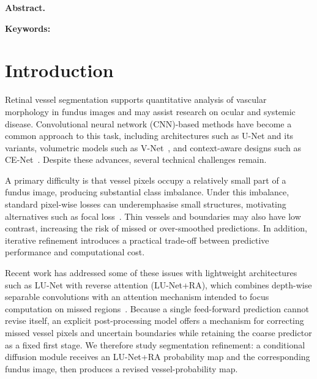 \documentclass[jimaging,article,submit,pdftex,moreauthors]
  {Definitions/mdpi}
\newif\ifmdpiclass\mdpiclasstrue
\newif\ifmdpiclass\mdpiclassfalse
\providecommand{\linelabel}[1]{}
\newcommand{\seclabel}[1]{\linelabel{rev:sec:#1}}
\begin{document}
\ifmdpiclass
\else
\begin{center}
  {\LARGE\bfseries \papertitle\par}
  \vspace{0.8em}
  {\large \paperauthor\par}
  \vspace{0.6em}
  {\small \paperaddress\par}
  \vspace{0.3em}
  {\small \papercorres\par}
\end{center}
\vspace{0.8em}
\noindent\textbf{Abstract.} \paperabstract\par
\vspace{0.5em}
\noindent\textbf{Keywords:} \paperkeywords\par
\vspace{1em}
\fi



\section{Introduction}
\label{sec:introduction}
\seclabel{introduction}

Retinal vessel segmentation supports quantitative analysis of vascular morphology in fundus images and may assist research on ocular and systemic disease. Convolutional neural network (CNN)-based methods have become a common approach to this task, including architectures such as U-Net and its variants, volumetric models such as V-Net~\cite{Milletari2016}, and context-aware designs such as CE-Net~\cite{Gu2019CENet}. Despite these advances, several technical challenges remain.

A primary difficulty is that vessel pixels occupy a relatively small part of a fundus image, producing substantial class imbalance. Under this imbalance, standard pixel-wise losses can underemphasise small structures, motivating alternatives such as focal loss~\cite{Lin2017}. Thin vessels and boundaries may also have low contrast, increasing the risk of missed or over-smoothed predictions. In addition, iterative refinement introduces a practical trade-off between predictive performance and computational cost.

Recent work has addressed some of these issues with lightweight architectures such as LU-Net with reverse attention (LU-Net+RA), which combines depth-wise separable convolutions with an attention mechanism intended to focus computation on missed regions~\cite{Hernandez2025}. Because a single feed-forward prediction cannot revise itself, an explicit post-processing model offers a mechanism for correcting missed vessel pixels and uncertain boundaries while retaining the coarse predictor as a fixed first stage. We therefore study segmentation refinement: a conditional diffusion module receives an LU-Net+RA probability map and the corresponding fundus image, then produces a revised vessel-probability map.
\end{document}
